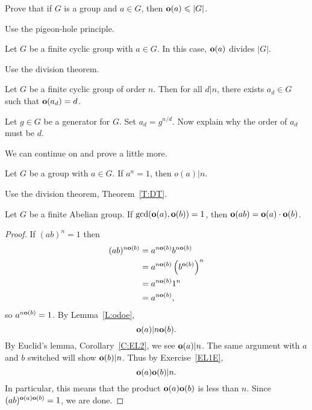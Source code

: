 \documentclass{ximera}
\begin{document}
\begin{lemma}
  Prove that if $G$ is a group and $a\in G$, then $\mathbf o(a)\leqslant |G|$.
  \begin{sketch}
    Use the pigeon-hole principle.
  \end{sketch}
\end{lemma}


\begin{theorem}\label{T:eodvgo}
  Let $G$ be a finite cyclic group with $a\in G$. In this case,
  $\mathbf o(a)$ divides $|G|$.
  \begin{sketch}
    Use the division theorem.
  \end{sketch}
\end{theorem}

\begin{corollary}
  Let $G$ be a finite cyclic group of order $n$. Then for all $d|n$,
  there exists $a_d\in G$ such that $\mathbf o(a_d) = d$.
  \begin{sketch}
    Let $g\in G$ be a generator for $G$. Set $a_d = g^{n/d}$. Now
    explain why the order of $a_d$ must be $d$.
  \end{sketch}
\end{corollary}

We can continue on and prove a little more.



\begin{lemma}\label{L:odoe}
  Let $G$ be a group with $a\in G$. If $a^n = 1$, then $o(a)|n$.
  \begin{sketch}
    Use the division theorem, Theorem~\ref{T:DT}.
  \end{sketch}
\end{lemma}


\begin{lemma}\label{L:cpeo}
  Let $G$ be a finite Abelian group. If $\gcd(\mathbf o(a),\mathbf o(b)) = 1$, then
  $\mathbf o(ab) = \mathbf o(a)\cdot \mathbf o(b)$.
  \begin{proof}
    If $(ab)^n = 1$ then
    \begin{align*}
      (ab)^{n\mathbf o(b)} &= a^{n\mathbf o(b)}b^{n\mathbf o(b)}\\
      &=a^{n\mathbf o(b)}\left(b^{\mathbf o(b)}\right)^n \\
      &=a^{n\mathbf o(b)}1^n \\
      &=a^{n\mathbf o(b)},
    \end{align*}
    so $a^{n\mathbf o(b)} = 1$. By Lemma~\ref{L:odoe},
    \[
    \mathbf o(a) | n\mathbf o(b).
    \]
    By Euclid's lemma, Corollary~\ref{C:EL2}, we see $\mathbf o(a) | n$. The
    same argument with $a$ and $b$ switched will show $\mathbf o(b)|n$. Thus
    by Exercise~\ref{EL1E},
    \[
    \mathbf o(a)\mathbf o(b)|n.
    \]
    In particular, this means that the product $\mathbf o(a)\mathbf o(b)$ is less than $n$.
    Since $(ab)^{\mathbf o(a)\mathbf o(b)} = 1$, we are done.
  \end{proof}
\end{lemma}
\end{document}

